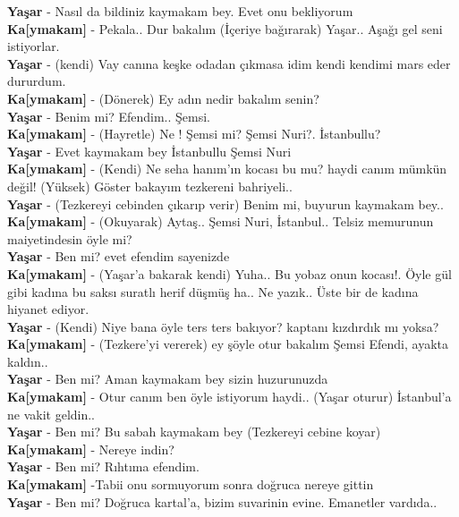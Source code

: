 \documentclass[]{book}
\begin{document}
\textbf{Yaşar} - Nasıl da bildiniz kaymakam bey. Evet onu bekliyorum\\
\textbf{Ka{[}ymakam{]}} - Pekala.. Dur bakalım (İçeriye bağırarak) Yaşar.. Aşağı gel seni istiyorlar.\\
\textbf{Yaşar} - (kendi) Vay canına keşke odadan çıkmasa idim kendi kendimi mars eder dururdum.\\
\textbf{Ka{[}ymakam{]}} - (Dönerek) Ey adın nedir bakalım senin?\\
\textbf{Yaşar} - Benim mi? Efendim.. Şemsi.\\
\textbf{Ka{[}ymakam{]}} - (Hayretle) Ne ! Şemsi mi? Şemsi Nuri?. İstanbullu?\\
\textbf{Yaşar} - Evet kaymakam bey İstanbullu Şemsi Nuri\\
\textbf{Ka{[}ymakam{]}} - (Kendi) Ne seha hanım'ın kocası bu mu? haydi canım mümkün değil! (Yüksek) Göster bakayım tezkereni bahriyeli..\\
\textbf{Yaşar} - (Tezkereyi cebinden çıkarıp verir) Benim mi, buyurun kaymakam bey..\\
\textbf{Ka{[}ymakam{]}} - (Okuyarak) Aytaş.. Şemsi Nuri, İstanbul.. Telsiz memurunun maiyetindesin öyle mi?\\
\textbf{Yaşar} - Ben mi? evet efendim sayenizde\\
\textbf{Ka{[}ymakam{]}} - (Yaşar'a bakarak kendi) Yuha.. Bu yobaz onun kocası!. Öyle gül gibi kadına bu saksı suratlı herif düşmüş ha.. Ne yazık.. Üste bir de kadına hiyanet ediyor.\\
\textbf{Yaşar} - (Kendi) Niye bana öyle ters ters bakıyor? kaptanı kızdırdık mı yoksa?\\
\textbf{Ka{[}ymakam{]}} - (Tezkere'yi vererek) ey şöyle otur bakalım Şemsi Efendi, ayakta kaldın..\\
\textbf{Yaşar} - Ben mi? Aman kaymakam bey sizin huzurunuzda\\
\textbf{Ka{[}ymakam{]}} - Otur canım ben öyle istiyorum haydi.. (Yaşar oturur) İstanbul'a ne vakit geldin..\\
\textbf{Yaşar} - Ben mi? Bu sabah kaymakam bey (Tezkereyi cebine koyar)\\
\textbf{Ka{[}ymakam{]}} - Nereye indin?\\
\textbf{Yaşar} - Ben mi? Rıhtıma efendim.\\
\textbf{Ka{[}ymakam{]}} -Tabii onu sormuyorum sonra doğruca nereye gittin\\
\textbf{Yaşar} - Ben mi? Doğruca kartal'a, bizim suvarinin evine. Emanetler vardıda..\\
\end{document}
